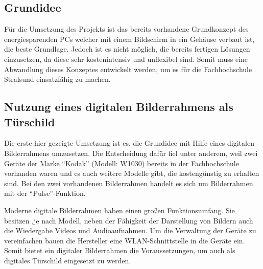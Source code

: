 \begin{flushleft}
\subsection{Grundidee}
Für die Umsetzung des Projekts ist das bereits vorhandene Grundkonzept des energiesparenden PCs welcher mit einem Bildschirm in ein Gehäuse verbaut ist, die beste Grundlage. Jedoch ist es nicht möglich, die bereits fertigen Lösungen einzusetzen, da diese sehr kostenintensiv und unflexibel sind. Somit muss eine Abwandlung dieses Konzeptes entwickelt werden, um es für die Fachhochschule Stralsund einsatzfähig zu machen. 

\subsection{Nutzung eines digitalen Bilderrahmens als Türschild} \label{subsec:nutzungBilderrahmen}
Die erste hier gezeigte Umsetzung ist es, die Grundidee mit Hilfe eines digitalen Bilderrahmens umzusetzen. Die Entscheidung dafür fiel unter anderem, weil zwei Geräte der Marke ``Kodak'' (Modell: W1030) bereits in der Fachhochschule vorhanden waren und es auch weitere Modelle gibt, die kostengünstig zu erhalten sind. Bei den zwei vorhandenen Bilderrahmen handelt es sich um Bilderrahmen mit der ``Pulse''-Funktion. 

Moderne digitale Bilderrahmen haben einen großen Funktionsumfang. Sie besitzen ,je nach Modell, neben der Fähigkeit der Darstellung von Bildern auch die Wiedergabe Videos und Audioaufnahmen. Um die Verwaltung der Geräte zu vereinfachen bauen die Hersteller eine WLAN-Schnittstelle in die Geräte ein. Somit bietet ein digitaler Bilderrahmen die Voraussetzungen, um auch als digitales Türschild eingesetzt zu werden. 


\end{flushleft}
